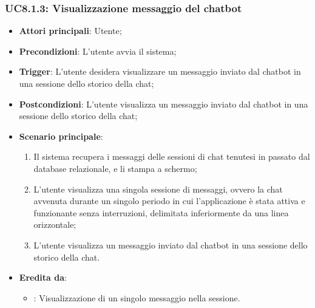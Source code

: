 \subsubsection{UC8.1.3: Visualizzazione messaggio del chatbot}
\begin{itemize}
    \item \textbf{Attori principali}: Utente;
    \item \textbf{Precondizioni}: L'utente avvia il sistema;
    \item \textbf{Trigger}: L'utente desidera visualizzare un messaggio inviato dal chatbot in una sessione dello storico della chat;
    \item \textbf{Postcondizioni}: L'utente visualizza un messaggio inviato dal chatbot in una sessione dello storico della chat;
    \item \textbf{Scenario principale}:
    \begin{enumerate}
        \item Il sistema recupera i messaggi delle sessioni di chat tenutesi in passato dal database relazionale, e li stampa a schermo;
        \item L'utente visualizza una singola sessione di messaggi, ovvero la chat avvenuta durante un singolo periodo in cui l'applicazione
        è stata attiva e funzionante senza interruzioni, delimitata inferiormente da una linea orizzontale;
        \item L'utente visualizza un messaggio inviato dal chatbot in una sessione dello storico della chat.
    \end{enumerate}
    \item \textbf{Eredita da}:
    \begin{itemize}
        \item {}: Visualizzazione di un singolo messaggio nella sessione.
    \end{itemize}
\end{itemize}

\hypertarget{UC9}{}
